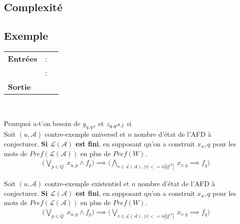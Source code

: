 \documentclass[12pt,a4paper,oneside,titlepage]{report}
\begin{document}
\newpage
\subsection{Complexité}
\newpage 
\subsection{Exemple}

\begin{algorithm}[H]
\caption{}\label{}
\hspace*{\algorithmicindent} 
\begin{tabular}{lll}
	\textbf{Entrées} & \textbf{} : &\\
	&\textbf{} : &\\
	\textbf{Sortie} &\multicolumn{2}{l}{}\\
\end{tabular}\\
\begin{algorithmic}[1]
\State 
\end{algorithmic}
\end{algorithm}

\newpage
\noindent Pourquoi a-t'on besoin de $y_{q,q^\mathcal{A}}$ et $z_{q,q^\mathcal{A},\mathnormal{l}}$ si\\


\noindent Soit $(u,\mathcal{A})$ contre-exemple universel et $n$ nombre d'état de l'AFD à conjecturer. \textbf{Si $\mathcal{L}(\mathcal{A})$ est fini}, en supposant qu'on a construit $x_u,q$ pour les mots de $Pref(\mathcal{L}(\mathcal{A}))$ en plus de $Pref(W)$.
\begin{equation}
\begin{aligned}
\bigl ( \bigvee_{p\in Q}~ x_{u,p}\land f_p \bigr ) \implies \bigl ( \bigwedge_{v\in\mathcal{L}(\mathcal{A}), |v|<=n|Q^\mathcal{A}|}~ x_{v,q}\implies f_q \bigr )
\end{aligned}
\end{equation}

\noindent Soit $(u,\mathcal{A})$ contre-exemple existentiel et $n$ nombre d'état de l'AFD à conjecturer. \textbf{Si $\mathcal{L}(\mathcal{A})$ est fini}, en supposant qu'on a construit $x_u,q$ pour les mots de $Pref(\mathcal{L}(\mathcal{A}))$ en plus de $Pref(W)$.
\begin{equation}
\begin{aligned}
\bigl ( \bigvee_{p\in Q}~ x_{u,p}\land f_p \bigr ) \implies \bigl ( \bigvee_{v\in\mathcal{L}(\mathcal{A}), |v|<=n|Q^\mathcal{A}|}~ x_{v,q}\implies f_q \bigr )
\end{aligned}
\end{equation}\\
\end{document}
